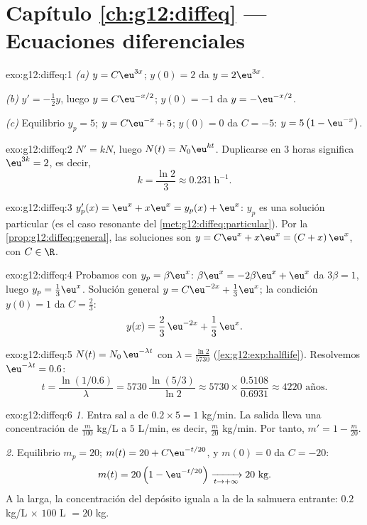 \section*{Capítulo \ref{ch:g12:diffeq} --- Ecuaciones diferenciales}

\begin{solution}{exo:g12:diffeq:1}
\emph{(a)} $y = C\eu^{3x}$; $y(0) = 2$ da $y = 2\eu^{3x}$.

\emph{(b)} $y' = -\frac12 y$, luego $y = C\eu^{-x/2}$; $y(0) = -1$ da
$y = -\eu^{-x/2}$.

\emph{(c)} Equilibrio $y_p = 5$; $y = C\eu^{-x} + 5$; $y(0) = 0$ da
$C = -5$: $y = 5\left(1 - \eu^{-x}\right)$.
\end{solution}

\begin{solution}{exo:g12:diffeq:2}
$N' = kN$, luego $N(t) = N_0 \eu^{kt}$. Duplicarse en $3$ horas significa
$\eu^{3k} = 2$, es decir,
\[
k = \frac{\ln 2}{3} \approx 0.231\ \text{h}^{-1}.
\]
\end{solution}

\begin{solution}{exo:g12:diffeq:3}
$y_p'(x) = \eu^x + x\eu^x = y_p(x) + \eu^x$: $y_p$ es una solución
particular (es el caso resonante del \cref{met:g12:diffeq:particular}). Por
la \cref{prop:g12:diffeq:general}, las soluciones son
$y = C\eu^{x} + x\eu^{x} = (C + x)\,\eu^x$, con $C \in \R$.
\end{solution}

\begin{solution}{exo:g12:diffeq:4}
Probamos con $y_p = \beta\eu^x$: $\beta\eu^x = -2\beta\eu^x + \eu^x$ da
$3\beta = 1$, luego $y_p = \frac13\eu^x$. Solución general
$y = C\eu^{-2x} + \frac13\eu^{x}$; la condición $y(0) = 1$ da
$C = \frac23$:
\[
y(x) = \frac{2}{3}\,\eu^{-2x} + \frac{1}{3}\,\eu^{x}.
\]
\end{solution}

\begin{solution}{exo:g12:diffeq:5}
$N(t) = N_0\,\eu^{-\lambda t}$ con $\lambda = \frac{\ln 2}{5730}$
(\cref{ex:g12:exp:halflife}). Resolvemos $\eu^{-\lambda t} = 0.6$:
\[
t = \frac{\ln(1/0.6)}{\lambda} = 5730\,\frac{\ln(5/3)}{\ln 2}
\approx 5730 \times \frac{0.5108}{0.6931} \approx 4220 \text{ años}.
\]
\end{solution}

\begin{solution}{exo:g12:diffeq:6}
\emph{1.} Entra sal a  de $0.2 \times 5 = 1$ kg/min. La salida lleva
una concentración de $\frac{m}{100}$ kg/L a $5$ L/min, es decir,
$\frac{m}{20}$ kg/min. Por tanto, $m' = 1 - \frac{m}{20}$.

\emph{2.} Equilibrio $m_p = 20$; $m(t) = 20 + C\eu^{-t/20}$, y $m(0) = 0$
da $C = -20$:
\[
m(t) = 20\left(1 - \eu^{-t/20}\right) \xrightarrow[t\to+\infty]{} 20 \text{ kg}.
\]
A la larga, la concentración del depósito iguala a la de la salmuera
entrante: $0.2$ kg/L $\times$ $100$ L $= 20$ kg.
\end{solution}

